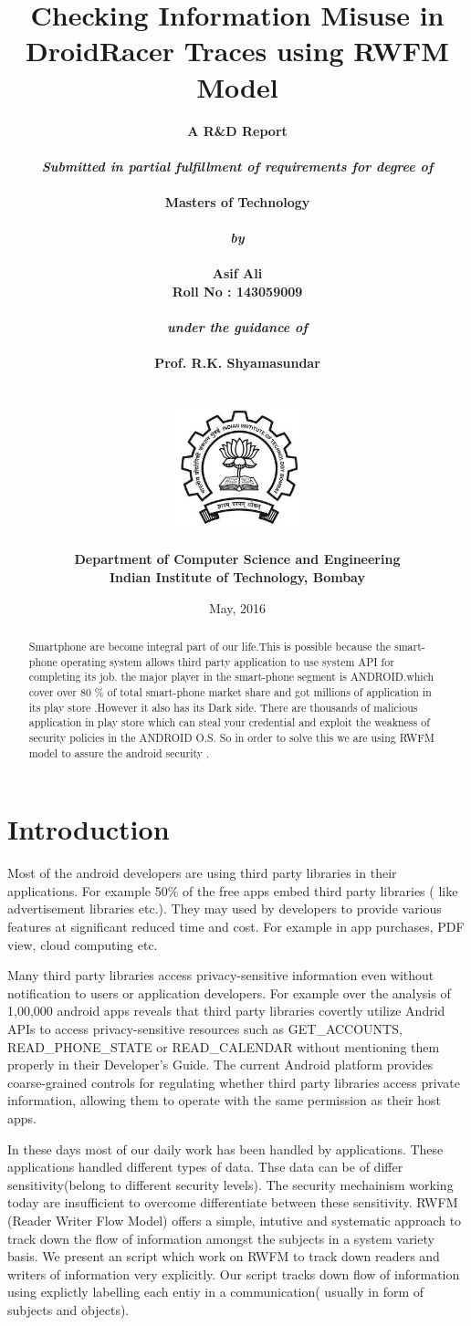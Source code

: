 \documentclass[11pt]{report}
\title{\textbf{Checking Information Misuse in DroidRacer Traces using RWFM Model}}
\author{\bf{A R\&D Report}\\
        \\
        \emph{Submitted in partial fulfillment of requirements for degree of}\\
        \\
        \bf{Masters of Technology}\\
        \\
        \emph{by}\\
        \\
		\bf{Asif Ali}\\
        \bf{Roll No : 143059009}\\
        \\
        \emph{under the guidance of}\\
        \\
        \bf{Prof. R.K. Shyamasundar}\\
        \\\\
        \includegraphics[height=3.5cm]{./images/iitb_logo}\\
        \\
        \bf{Department of Computer Science and Engineering}\\
        \bf{Indian Institute of Technology, Bombay}\\
}
\date{May, 2016}
\begin{document}
\maketitle
{}
\tableofcontents
\begin{abstract}
 Smartphone are become integral part of our life.This is possible because the smart-phone operating system allows third party application to use system API for completing its job.
the major player in the smart-phone segment is ANDROID.which cover over 80 \% of total smart-phone market share and got millions of application in its play store .However it also has its Dark side.
There are thousands of malicious application in play store which can steal your credential and exploit the weakness of security policies in the ANDROID O.S.
So in order to solve this we are using RWFM model to assure the android security . 
\end{abstract}
\pagebreak

\chapter{Introduction}
Most of the android developers are using third party libraries in their applications. For example 50\% of the free apps embed third party libraries ( like advertisement libraries etc.). 
They may used by developers to provide various features at significant reduced time and cost. For example in app purchases, PDF view, cloud computing etc.
\par Many third party libraries access privacy-sensitive information even without notification to users or application developers. For example over the analysis of 1,00,000 android
apps reveals that third party libraries covertly utilize Andrid APIs to access privacy-sensitive resources such as GET\_ACCOUNTS, READ\_PHONE\_STATE or READ\_CALENDAR without mentioning
them properly in their Developer’s Guide. The current Android platform provides coarse-grained controls for regulating whether third party libraries access private information, allowing
them to operate with the same permission as their host apps.
\par In these days most of our daily work has been handled by applications. These applications handled different types of data. Thse data can be of differ sensitivity(belong to different
security levels). The security mechainism working today are insufficient to overcome differentiate between these sensitivity. RWFM (Reader Writer Flow Model) offers a simple, intutive
and systematic approach to track down the flow of information amongst the subjects in a system variety basis. We present an script which work on RWFM to track down readers and writers of information very explicitly.
Our script tracks down flow of information using explictly labelling each entiy in a communication( usually in form of subjects and objects). 
\end{document}
